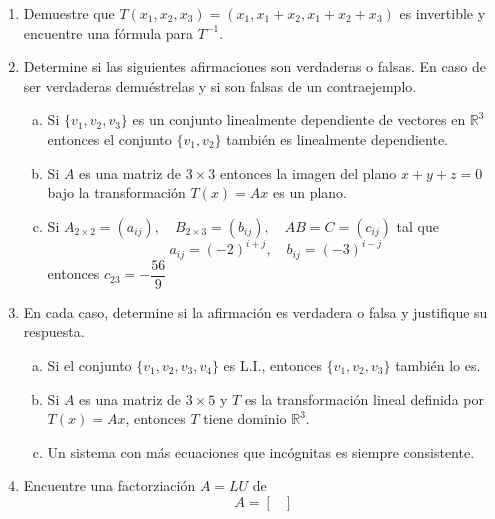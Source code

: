 \documentclass[12pt]{article}
\newenvironment{preguntas}
{\begin{enumerate}\itemsep12pt
	}
	{
	\end{enumerate}
}
\newcommand{\R}{\mathbb{R}}
\begin{document}
\begin{preguntas}
$$\begin{array}{r}
\end{array}\right)= \left(\begin{array}{r}
  1\\0\\1
\end{array}\right), \qquad  A\left(\begin{array}{r}
  -1\\1\\1
\end{array}\right)= \left(\begin{array}{r}
  0\\1\\1
\end{array}\right).$$ Calcule $A^{-1}$.
\item Demuestre que $T(x_1,x_2, x_3)=(x_1,x_1+x_2, x_1+x_2+x_3)$ es invertible y encuentre una f\'ormula para $T^{-1}$.
\item Determine si las siguientes afirmaciones son verdaderas o falsas. En caso de ser verdaderas demuéstrelas y si son falsas de un contraejemplo.
\begin{enumerate}[a)]
\item Si $\{v_1, v_2, v_3\}$ es un conjunto linealmente dependiente de vectores en $\R^3$ entonces el conjunto $\{v_1, v_2\}$ también es linealmente dependiente.
\item Si $A$ es una matriz de $3 \times 3$ entonces la imagen del plano $x+y+z=0$ bajo la transformación $T(x)=Ax$ es un plano.
\item Si $A_{2\times 2} = (a_{ij}), \quad B_{2\times 3} = (b_{ij}), \quad AB = C = (c_{ij})$ tal que
$$a_{ij} = (-2)^{i+j}, \quad b_{ij} = (-3)^{i-j}$$
entonces $c_{23} = -\dfrac{56}{9}$
\end{enumerate}
\item En cada caso, determine si la afirmación es verdadera o falsa y justifique su respuesta.
\begin{enumerate}[a)]
\item Si el conjunto $\{v_1, v_2, v_3, v_4\}$ es L.I., entonces $\{v_1, v_2, v_3\}$ también lo es.
\item Si $A$ es una matriz de $3\times 5$ y $T$ es la transformación lineal definida por $T(x) = Ax$, entonces $T$ tiene dominio $\R^3$.
\item Un sistema con más ecuaciones que incógnitas es siempre consistente.
\end{enumerate}
\item Encuentre una factorziación $A = LU$ de
	$$A = \begin{bmatrix}

\end{bmatrix}$$
\end{preguntas}
\end{document}
